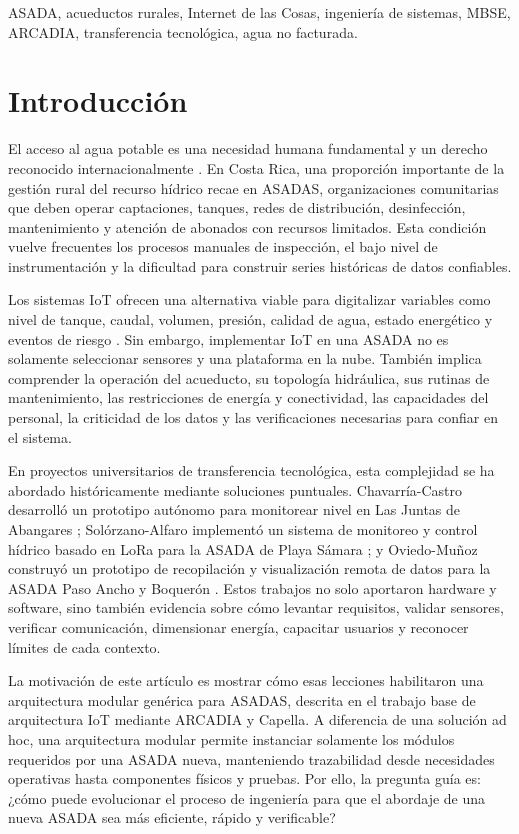 \documentclass[conference]{IEEEtran}
\begin{document}
\begin{IEEEkeywords}
ASADA, acueductos rurales, Internet de las Cosas, ingeniería de sistemas, MBSE, ARCADIA, transferencia tecnológica, agua no facturada.
\end{IEEEkeywords}

\section{Introducción}
El acceso al agua potable es una necesidad humana fundamental y un derecho reconocido internacionalmente \cite{un_resolution_2010}. En Costa Rica, una proporción importante de la gestión rural del recurso hídrico recae en ASADAS, organizaciones comunitarias que deben operar captaciones, tanques, redes de distribución, desinfección, mantenimiento y atención de abonados con recursos limitados. Esta condición vuelve frecuentes los procesos manuales de inspección, el bajo nivel de instrumentación y la dificultad para construir series históricas de datos confiables.

Los sistemas IoT ofrecen una alternativa viable para digitalizar variables como nivel de tanque, caudal, volumen, presión, calidad de agua, estado energético y eventos de riesgo \cite{6844741}. Sin embargo, implementar IoT en una ASADA no es solamente seleccionar sensores y una plataforma en la nube. También implica comprender la operación del acueducto, su topología hidráulica, sus rutinas de mantenimiento, las restricciones de energía y conectividad, las capacidades del personal, la criticidad de los datos y las verificaciones necesarias para confiar en el sistema.

En proyectos universitarios de transferencia tecnológica, esta complejidad se ha abordado históricamente mediante soluciones puntuales. Chavarría-Castro desarrolló un prototipo autónomo para monitorear nivel en Las Juntas de Abangares \cite{Chavarria2021}; Solórzano-Alfaro implementó un sistema de monitoreo y control hídrico basado en LoRa para la ASADA de Playa Sámara \cite{Solorzano2021}; y Oviedo-Muñoz construyó un prototipo de recopilación y visualización remota de datos para la ASADA Paso Ancho y Boquerón \cite{Oviedo2024}. Estos trabajos no solo aportaron hardware y software, sino también evidencia sobre cómo levantar requisitos, validar sensores, verificar comunicación, dimensionar energía, capacitar usuarios y reconocer límites de cada contexto.

La motivación de este artículo es mostrar cómo esas lecciones habilitaron una arquitectura modular genérica para ASADAS, descrita en el trabajo base de arquitectura IoT mediante ARCADIA y Capella. A diferencia de una solución ad hoc, una arquitectura modular permite instanciar solamente los módulos requeridos por una ASADA nueva, manteniendo trazabilidad desde necesidades operativas hasta componentes físicos y pruebas. Por ello, la pregunta guía es: ¿cómo puede evolucionar el proceso de ingeniería para que el abordaje de una nueva ASADA sea más eficiente, rápido y verificable?
\end{document}
